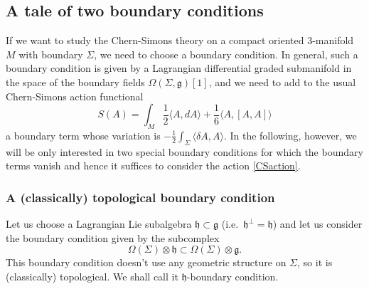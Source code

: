 \documentclass[a4paper]{amsart}
\theoremstyle{plain}
\theoremstyle{definition}
\newcommand{\g}{\mathfrak{g}}
\newcommand{\h}{\mathfrak{h}}
\newcommand{\la}{\langle}
\newcommand{\ra}{\rangle}
\begin{document}
\subsection{A tale of two boundary conditions}
If we want to study the Chern-Simons theory on a compact oriented 3-manifold $M$ with boundary $\Sigma$, we need to choose a boundary condition. In general, such a boundary condition is given by a Lagrangian differential graded submanifold in the space of the boundary fields $\Omega(\Sigma,\g)[1]$, and we need to add to the usual Chern-Simons action functional
\begin{equation}\label{CSaction}
S(A) = \int_M \frac12 \la A,dA \ra + \frac16 \la A, [A,A] \ra
\end{equation}
a boundary term whose variation is $-\frac12\int_\Sigma\la\delta A,A\ra$. %
In the following, however, we will be only interested in two special boundary conditions for which the  boundary terms  vanish and hence it suffices to consider the action \eqref{CSaction}.

\subsubsection{A (classically) topological boundary condition}
Let us choose a Lagrangian Lie subalgebra $\h\subset\g$ (i.e.\ $\h^\perp=\h$) and let us consider the boundary condition given by the subcomplex
\begin{equation}\label{h-bc}
\Omega(\Sigma)\otimes\h\subset\Omega(\Sigma)\otimes\g.
\end{equation}
This boundary condition doesn't use any geometric structure on $\Sigma$, so it is (classically) topological. %
 We shall call it $\h$-boundary condition.
\end{document}
